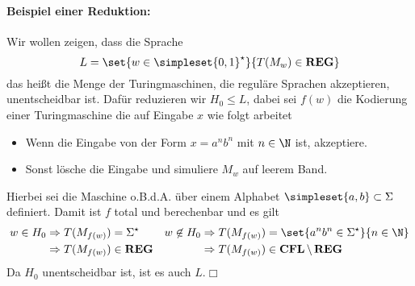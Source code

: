 \paragraph{Beispiel einer Reduktion:}
Wir wollen zeigen, dass die Sprache
$$L=\set{w\in\simpleset{0,1}^\star}{T(M_w)\in\reg}$$
das heißt die Menge der Turingmaschinen, die reguläre Sprachen akzeptieren, unentscheidbar ist. Dafür reduzieren wir $H_0\leq L$, dabei sei $f(w)$ die Kodierung einer Turingmaschine die auf Eingabe $x$ wie folgt arbeitet
\begin{itemize}
	\item Wenn die Eingabe von der Form $x=a^nb^n$ mit $n\in\N$ ist, akzeptiere.
	\item Sonst lösche die Eingabe und simuliere $M_w$ auf leerem Band.
\end{itemize}
Hierbei sei die Maschine o.B.d.A. über einem Alphabet $\simpleset{a,b}\subset\Sigma$ definiert.
Damit ist $f$ total und berechenbar und es gilt
\begin{align*}
	w\in H_0&\Rightarrow T(M_{f(w)})=\Sigma^\star & w\not\in H_0&\Rightarrow T(M_{f(w)})=\set{a^nb^n\in\Sigma^\star}{n\in\N}\\
	&\Rightarrow T(M_{f(w)})\in\reg&&\Rightarrow T(M_{f(w)})\in\cfl\setminus\reg 
\end{align*}
Da $H_0$ unentscheidbar ist, ist es auch $L$.\hfill$\Box$